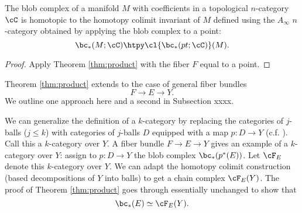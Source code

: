 
\medskip

\begin{cor}
\label{cor:new-old}
The blob complex of a manifold $M$ with coefficients in a topological $n$-category $\cC$ is homotopic to the homotopy colimit invariant of $M$ defined using the $A_\infty$ $n$-category obtained by applying the blob complex to a point:
$$\bc_*(M; \cC) \htpy \cl{\bc_*(pt; \cC)}(M).$$ 
\end{cor}
\begin{proof}
Apply Theorem \ref{thm:product} with the fiber $F$ equal to a point.
\end{proof}

\medskip

Theorem \ref{thm:product} extends to the case of general fiber bundles
\[
	F \to E \to Y .
\]
We outline one approach here and a second in Subsection xxxx.

We can generalize the definition of a $k$-category by replacing the categories
of $j$-balls ($j\le k$) with categories of $j$-balls $D$ equipped with a map $p:D\to Y$
(c.f. \cite{MR2079378}).
Call this a $k$-category over $Y$.
A fiber bundle $F\to E\to Y$ gives an example of a $k$-category over $Y$:
assign to $p:D\to Y$ the blob complex $\bc_*(p^*(E))$.
Let $\cF_E$ denote this $k$-category over $Y$.
We can adapt the homotopy colimit construction (based decompositions of $Y$ into balls) to
get a chain complex $\cF_E(Y)$.
The proof of Theorem \ref{thm:product} goes through essentially unchanged 
to show that
\[
	\bc_*(E) \simeq \cF_E(Y) .
\]







